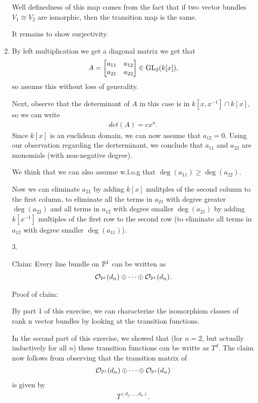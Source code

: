 \begin{exercise}{2}
\begin{enumerate}
{                Well definedness of this map comes from the fact that if two vector bundles 
                $V_1\cong V_2$ are ismorphic, then the transition map is the same.

                It remains to show surjectivity.


        }
    \item
    By left multiplication we get a diagonal matrix we get that 
    \begin{align*}
        A=\begin{bmatrix}
            a_{11}&a_{12}\\
            a_{21}&a_{22}
        \end{bmatrix}
        \in \operatorname{GL}_2(k[x]),
    \end{align*}
    so assume this without loss of generality.

    Next, observe that the determinant of $A$ in this case is in $k[x,x^{-1}]\cap k[x]$, so we can write 
    \begin{align*}
        det(A)=cx^n.
    \end{align*}
    Since $k[x]$ is an euclidean domain, we can now assume that $a_{12}=0$. Using our observation regarding
    the derterminant, we conclude that $a_{11}$ and $a_{22}$ are monomials (with non-negative degree).

    We think that we can also assume w.l.o.g that $\deg(a_{11})\geq \deg(a_{22})$.


    Now we can eliminate $a_{21}$ by adding $k[x]$ mulitples of the second column to the first column, to 
    eliminate all the terms in $a_{21}$ with degree greater $\deg(a_{22})$ and all terms in
    $a_{12}$ with degree smaller $\deg(a_{21})$ by adding $k[x^{-1}]$ multiples of the first row 
    to the second row (to eliminate all terms in $a_{12}$ with degree smaller $\deg(a_{11})$).

    \item[3.]{
        Claim: Every line bundle on $\mathbb{P}^1$ can be written as 
        \begin{align*}
            \mathcal{O}_{\mathbb{P}^1}(d_n)\oplus \dots \oplus \mathcal{O}_{\mathbb{P} ^1}(d_n).
        \end{align*}
        
        Proof of claim:

        By part 1 of this exercise, we can characterize the isomorphism classes of rank n vector bundles by looking at the transition functions. 

        In the second part of this exercise, we showed that (for $n=2$, but actually inductively for all $n$) these 
        transition functions can be writte as $T^d$. The claim now follows from observing that the transition matrix of 
        \begin{align*}
            \mathcal{O}_{\mathbb{P}^1}(d_n)\oplus \dots \oplus \mathcal{O}_{\mathbb{P} ^1}(d_n)
        \end{align*}
        is given by
        \begin{align*}
            T^{(d_1,\dots, d_n)}.
        \end{align*}
    }
    \end{enumerate}
\end{exercise}

